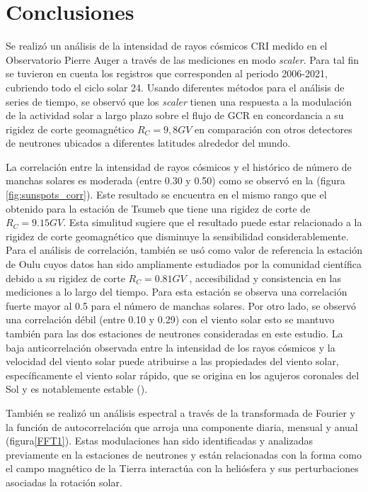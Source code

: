 \newpage
\chapter{Conclusiones}

Se realizó un análisis de la intensidad de rayos cósmicos CRI medido en el Observatorio Pierre Auger a través de las mediciones en modo \textit{scaler}. Para tal fin se tuvieron en cuenta los registros  que corresponden al periodo 2006-2021, cubriendo todo el ciclo solar 24.  Usando diferentes métodos para el análisis de series de tiempo, se observó que los \textit{scaler} tienen una respuesta a la modulación de la actividad solar a largo plazo sobre el flujo de GCR en concordancia a su rigidez de corte geomagnético $R_C=9,8 GV$ en comparación con otros detectores de neutrones ubicados a diferentes latitudes alrededor del mundo. 

La correlación entre la intensidad de rayos cósmicos y el histórico de número de manchas solares es moderada (entre  0.30 y 0.50) como se observó en la (figura \ref{fig:sunspots_corr}). Este resultado se encuentra en el mismo rango que el obtenido para la estación de Tsumeb que tiene una rigidez de corte de $R_C=9.15 GV$. Esta simulitud sugiere que el resultado puede estar relacionado a la rigidez de corte geomagnético que disminuye la sensibilidad considerablemente. Para el análisis de correlación, también se usó como valor de referencia la estación de Oulu cuyos datos han sido ampliamente estudiados por la comunidad científica debido a su rigidez de corte $R_C=0.81 GV$ , accesibilidad y consistencia en las mediciones a lo largo del tiempo. Para esta estación se observa una correlación fuerte mayor al 0.5  para el número de manchas solares.  Por otro lado, se observó una correlación débil (entre 0.10 y 0.29) con el viento solar esto se mantuvo también para las dos estaciones de neutrones consideradas en este estudio. La baja anticorrelación observada entre la intensidad de los rayos cósmicos y la velocidad del viento solar puede atribuirse a las propiedades del viento solar, específicamente el viento solar rápido, que se origina en los agujeros coronales del Sol y es notablemente estable (\cite{Oloketuyi_2020}).

También se realizó un análisis espectral a través de la transformada de Fourier y la función de autocorrelación que arroja una componente diaria, mensual y anual (figura\ref{FFT1}). Estas modulaciones han sido identificadas y analizadas previamente en la estaciones de neutrones y están relacionadas con la forma como el campo magnético de la Tierra interactúa con la heliósfera y sus perturbaciones asociadas la rotación solar. 

